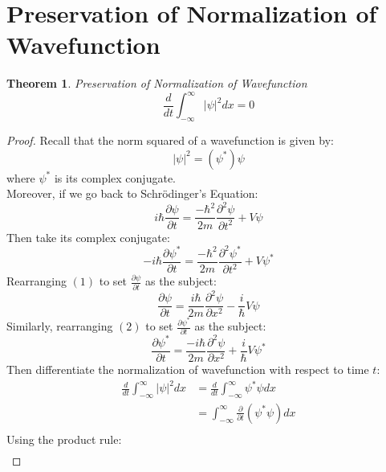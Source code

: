 \documentclass[hidelinks, a4paper, 12pt]{article}
\newtheorem{theorem}{Theorem}
\newcommand{\n}{\\[\baselineskip]}
\begin{document}
    \section{Preservation of Normalization of Wavefunction}
        \begin{theorem}
            Preservation of Normalization of Wavefunction
            \[\frac{d}{dt} \int_{-\infty}^{\infty}|\psi|^2dx = 0\]
        \end{theorem}
        \begin{proof}
            Recall that the norm squared of a wavefunction is given by:
            \[|\psi|^2 = (\psi^*) \psi\]
            where $\psi^*$ is its complex conjugate.\n
            Moreover, if we go back to Schrödinger's Equation:
            \begin{equation}
                i\hbar \frac{\partial\psi}{\partial t} = \frac{-\hbar^2}{2m}\frac{\partial^2\psi}{\partial t^2}+V\psi
            \end{equation}
            Then take its complex conjugate:
            \begin{equation}
                -i\hbar \frac{\partial\psi^*}{\partial t} = \frac{-\hbar^2}{2m}\frac{\partial^2\psi^*}{\partial t^2}+V\psi^*
            \end{equation}
            Rearranging $(1)$ to set $\frac{\partial\psi}{\partial t}$ as the subject:
            \begin{equation}
                \frac{\partial\psi}{\partial t} = \frac{i\hbar}{2m}\frac{\partial^2\psi}{\partial x^2} - \frac{i}{\hbar} V\psi
            \end{equation}
            Similarly, rearranging $(2)$ to set $\frac{\partial\psi^*}{\partial t}$ as the subject:
            \begin{equation}
                \frac{\partial\psi^*}{\partial t} = \frac{-i\hbar}{2m}\frac{\partial^2\psi}{\partial x^2} + \frac{i}{\hbar} V\psi^*
            \end{equation}
            Then differentiate the normalization of wavefunction with respect to time $t$:
            \[\begin{split}
                \frac{d}{dt} \int_{-\infty}^{\infty}|\psi|^2dx &= \frac{d}{dt} \int_{-\infty}^{\infty}\psi^*\psi dx\\
                &= \int_{-\infty}^{\infty}\frac{\partial}{\partial t} (\psi^*\psi) dx\\
            \end{split}\]
            Using the product rule:
            \[\begin{split}

\end{split}\]
\end{proof}
\end{document}
